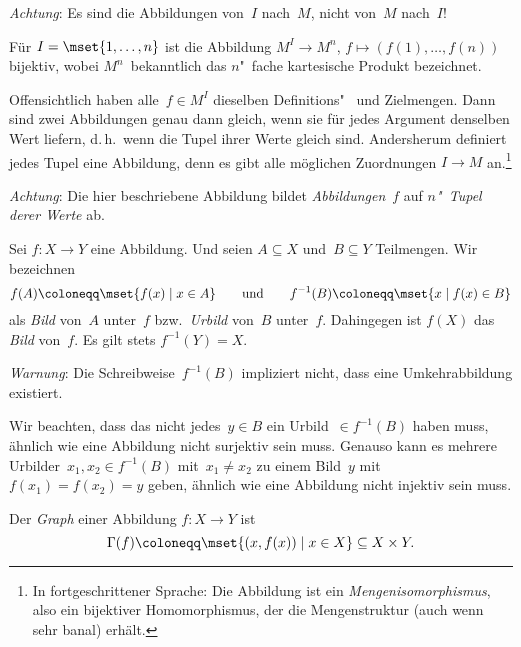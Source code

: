 \documentclass[a4paper]{article}
\begin{document}
\emph{Achtung}: Es sind die Abbildungen von~$I$ nach~$M$, nicht von~$M$ nach~$I$!

\begin{example}\label{ex:map:setisoproduct}
    Für $I = \mset{1, \dots, n}$ ist die Abbildung $M^I \to M^n$, $f \mapsto (f(1), \dots, f(n))$ bijektiv, wobei $M^n$~bekanntlich das $n$"~fache kartesische Produkt bezeichnet.

    Offensichtlich haben alle~$f \in M^I$ dieselben Definitions"~ und Zielmengen. Dann sind zwei Abbildungen genau dann gleich, wenn sie für jedes Argument denselben Wert liefern, d.\,h.\ wenn die Tupel ihrer Werte gleich sind. Andersherum definiert jedes Tupel eine Abbildung, denn es gibt alle möglichen Zuordnungen $I \to M$ an.\footnote{In fortgeschrittener Sprache: Die Abbildung ist ein \emph{Mengenisomorphismus}, also ein bijektiver Homomorphismus, der die Mengenstruktur (auch wenn sehr banal) erhält.}

    \emph{Achtung}: Die hier beschriebene Abbildung bildet \emph{Abbildungen}~$f$ auf \emph{$n$"~Tupel derer Werte} ab.
\end{example}

\begin{definition}
    Sei $f\colon X \to Y$ eine Abbildung. Und seien $A \subseteq X$ und~$B \subseteq Y$ Teilmengen. Wir bezeichnen
    \begin{equation*}
        f(A) \coloneqq \mset{f(x) \mid x \in A} \qquad\text{und}\qquad f^{-1}(B) \coloneqq \mset{x \mid f(x) \in B}
    \end{equation*}
    als \emph{Bild} von~$A$ unter~$f$ bzw.\ \emph{Urbild} von~$B$ unter~$f$. Dahingegen ist $f(X)$ das \emph{Bild} von~$f$. Es gilt stets $f^{-1}(Y) = X$.
\end{definition}

\emph{Warnung}: Die Schreibweise~$f^{-1}(B)$ impliziert nicht, dass eine Umkehrabbildung existiert.

\begin{remark}
    Wir beachten, dass das nicht jedes~$y \in B$ ein Urbild~$\in f^{-1}(B)$ haben muss, ähnlich wie eine Abbildung nicht surjektiv sein muss. Genauso kann es mehrere Urbilder~$x_1, x_2 \in f^{-1}(B)$ mit~$x_1 \neq x_2$ zu einem Bild~$y$ mit $f(x_1) = f(x_2) = y$ geben, ähnlich wie eine Abbildung nicht injektiv sein muss.
\end{remark}

\begin{definition}[Graph]
    Der \emph{Graph} einer Abbildung $f\colon X \to Y$ ist
    \begin{equation*}
        \Gamma(f) \coloneqq \mset{(x, f(x)) \mid x \in X} \subseteq X \times Y.
    \end{equation*}
\end{definition}
\end{document}
